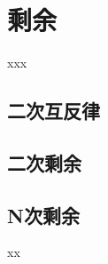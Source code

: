 \chapter{剩余}

\begin{introduction}
\item xxx
\end{introduction}


\section{二次互反律}

\section{二次剩余}

\section{N次剩余}


\begin{problemset}
	\item xx
\end{problemset}